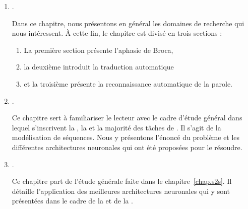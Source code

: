 \begin{enumerate}
    \item {}.
    
    Dans ce chapitre, nous présentons en général les domaines de recherche qui nous intéressent.
    À cette fin, le chapitre est divisé en trois sections :
    \begin{enumerate}[label=(\arabic*)]
        \item La première section présente l'aphasie de Broca,
        \item la deuxième introduit la traduction automatique
        \item et la troisième présente la reconnaissance automatique de la parole.
    \end{enumerate}

    \item {}.

    Ce chapitre sert à familiariser le lecteur avec le cadre d'étude général
    dans lequel s'inscrivent la , la 
    et la majorité des tâches de .
    Il s'agit de la modélisation de séquences.
    Nous y présentons l'énoncé du problème et les différentes architectures neuronales
    qui ont été proposées pour le résoudre.

    \item {}.
    
    Ce chapitre part de l'étude générale faite dans le chapitre~\ref{chap.s2s}.
    Il détaille l'application des meilleures architectures neuronales
    qui y sont présentées dans le cadre de la  et de la .
\end{enumerate}

